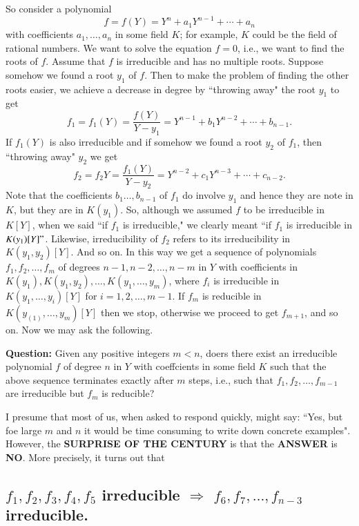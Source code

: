 So consider a polynomial
$$
f=f(Y) = Y^{n}+a_{1}Y^{n-1}+\cdots+a_{n}
$$
with coefficients $a_{1}, \ldots,a_{n}$ in some field $K$; for example, $K$ could be the field of rational numbers. We want to solve the equation $f=0$, i.e., we want to find the roots of $f$. Assume that $f$ is irreducible and has no multiple roots. Suppose somehow we found a root $y_{1} $ of $f$. Then to make the problem of finding the other roots easier, we achieve a decrease in degree by ``throwing away" the root $y_{1}$ to get
$$
f_{1}=f_{1}(Y)=\dfrac{f(Y)}{Y-y_{1}}=Y^{n-1}+b_{1}Y^{n-2}+\cdots+b_{n-1}.
$$
If $f_{1}(Y)$ is also irreducible and if somehow we found a root $y_{2}$ of $f_{1}$, then  ``throwing away" $y_{2}$ we get
$$
f_{2} = f_{2}Y = \dfrac{f_{1}(Y)}{Y-y_{2}}=Y^{n-2}+c_{1}Y^{n-3}+\cdots+c_{n-2}.
$$
Note that the coefficients $b_{1}\ldots, b_{n-1}$ of $f_{1}$ do involve $y_{1}$ and hence they are note in $K$, but they are in $K(y_{1})$. So, although we assumed $f$ to be irreducible in $K[Y]$, when we said ``if  $f_{1}$ is irreducible," we clearly meant ``if $f_{1}$ is irreducible in $K(y_{1})[Y]"$. Likewise, irreducibility of $f_{2}$ refers to its irreducibility in $K(y_{1}, y_{2})[Y]$. And so on. In this way we get a sequence of polynomials $f_{1}, f_{2}, \ldots, f_{m}$ of degrees $n-1, n-2, \ldots, n-m$ in $Y$ with coefficients in $K(y_1), K(y_{1}, y_{2}), \ldots, K(y_{1},\ldots,y_{m})$, where $f_{i}$ is irreducible in $K(y_{1}, \ldots, y_{i})[Y]$ for $i=1, 2, \ldots, m-1$. If $f_{m}$ is reducible in $K(y_(1), \ldots, y_{m})[Y]$ then we stop, otherwise we proceed to get $f_{m+1}$, and so on. Now we may ask the following. 

\noindent
{\bf Question:} Given any positive integers $m<n$, doers there exist an irreducible polynomial $f$ of degree $n$ in $Y$ with coeffcients in some field $K$ such that the above sequence terminates exactly after $m$ steps, i.e., such that  $f_{1}, f_{2}, \ldots, f_{m-1}$ are irreducible but $f_{m}$ is reducible?  

I presume that most of us, when asked to respond quickly, might say: ``Yes, but foe large $m$ and $n$ it would be time consuming to write down concrete examples". However, the {\bf SURPRISE OF THE CENTURY}  is that the {\bf ANSWER} is {\bf NO}. More precisely, it turns out that

\subsection{$f_{1}, f_{2}, f_{3}, f_{4}, f_{5}$ irreducible $\Rightarrow$
 $f_{6}, f_{7},\ldots, f_{n-3}$ irreducible.}\label{art1-sec2.1}

